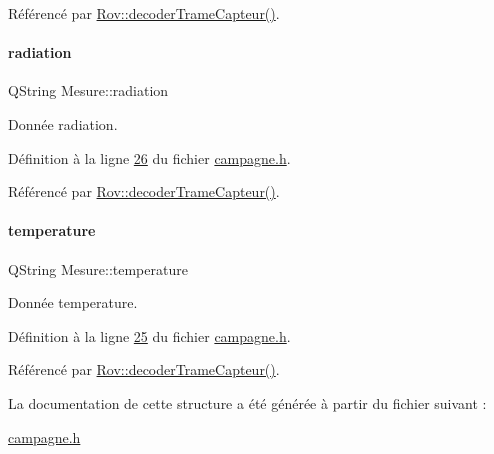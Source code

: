 Référencé par \hyperlink{rov_8cpp_source_l00086}{Rov\+::decoder\+Trame\+Capteur()}.

\mbox{\label{struct_mesure_a1dae237cf09302d426ea375b9afb12f7}} 
\paragraph{\texorpdfstring{radiation}{radiation}}
{\footnotesize\ttfamily Q\+String Mesure\+::radiation}



Donnée radiation. 



Définition à la ligne \hyperlink{campagne_8h_source_l00026}{26} du fichier \hyperlink{campagne_8h_source}{campagne.\+h}.



Référencé par \hyperlink{rov_8cpp_source_l00086}{Rov\+::decoder\+Trame\+Capteur()}.

\mbox{\label{struct_mesure_ad0dba8933e4b65b3781be7811f0f86ac}} 
\paragraph{\texorpdfstring{temperature}{temperature}}
{\footnotesize\ttfamily Q\+String Mesure\+::temperature}



Donnée temperature. 



Définition à la ligne \hyperlink{campagne_8h_source_l00025}{25} du fichier \hyperlink{campagne_8h_source}{campagne.\+h}.



Référencé par \hyperlink{rov_8cpp_source_l00086}{Rov\+::decoder\+Trame\+Capteur()}.



La documentation de cette structure a été générée à partir du fichier suivant \+:\begin{DoxyCompactItemize}
\item 
\hyperlink{campagne_8h}{campagne.\+h}\end{DoxyCompactItemize}
